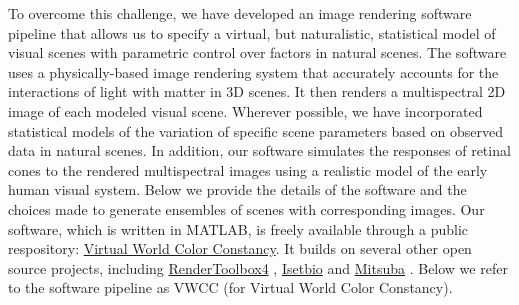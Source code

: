 \documentclass{jov}
\begin{document}
To overcome this  challenge, we have developed an image rendering software pipeline that allows us to specify a virtual, but naturalistic, statistical model of visual scenes with parametric control over factors in natural scenes. The software uses a physically-based image rendering system that accurately accounts for the interactions of light with matter in 3D scenes. It then renders a multispectral 2D image of each modeled visual scene. Wherever possible, we have incorporated statistical models of the variation of specific scene parameters based on observed data in natural scenes. In addition, our software simulates the responses of retinal cones to the rendered multispectral images using a realistic model of the early human visual system. Below we provide the details of the software and the choices made to generate ensembles of scenes with corresponding images. Our software, which is written in MATLAB, is freely available through a public respository: \href{https://github.com/BrainardLab/VirtualWorldColorConstancy}{Virtual World Color Constancy}. It builds on several other open source projects, including \href{http://rendertoolbox.org}{RenderToolbox4} \cite{heasly2014rendertoolbox3}, \href{http://isetbio.org}{Isetbio} and \href{https://www.mitsuba-renderer.org}{Mitsuba} \cite{jakob2015mitsuba}. Below we refer to the software pipeline as VWCC (for Virtual World Color Constancy).
\end{document}
